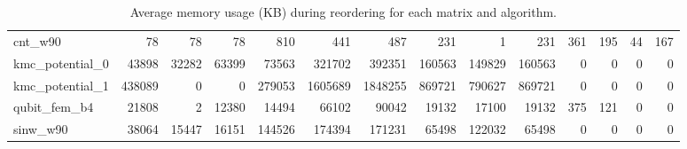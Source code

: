 \begin{sidewaystable}
{\begin{tabular}{ l r r r r r r r r r r r r r }
      cnt\_w90 & 78 & 78 & 78 & 810 & 441 & 487 & 231 & 1 & 231 & 361 & 195 & 44 & 167 \\
      kmc\_potential\_0 & 43898 & 32282 & 63399 & 73563 & 321702 & 392351 & 160563 & 149829 & 160563 & 0 & 0 & 0 & 0 \\
      kmc\_potential\_1 & 438089 & 0 & 0 & 279053 & 1605689 & 1848255 & 869721 & 790627 & 869721 & 0 & 0 & 0 & 0 \\
      qubit\_fem\_b4 & 21808 & 2 & 12380 & 14494 & 66102 & 90042 & 19132 & 17100 & 19132 & 375 & 121 & 0 & 0 \\
      sinw\_w90 & 38064 & 15447 & 16151 & 144526 & 174394 & 171231 & 65498 & 122032 & 65498 & 0 & 0 & 0 & 0 \\
      \bottomrule
    \end{tabular}
    }%
    \caption{Average memory usage (KB) during reordering for each matrix and algorithm.}%
    \label{tbl:reorder_avg_memory_results}
\end{sidewaystable}

\clearpage



